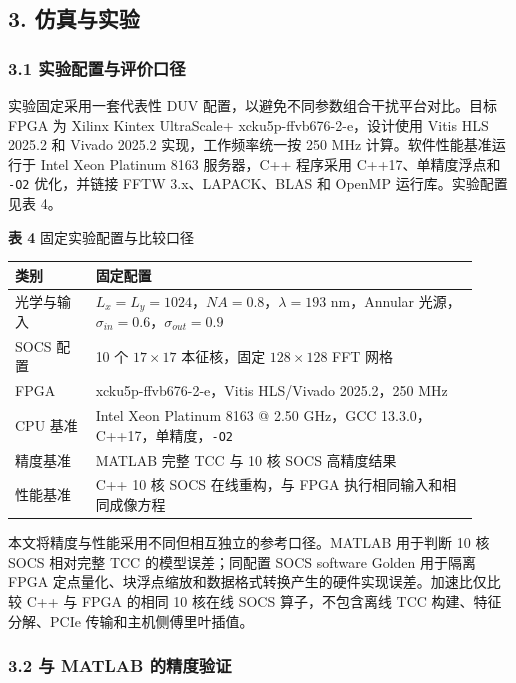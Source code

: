 \subsection{3. 仿真与实验}\label{sec:experiments}

\subsubsection{3.1 实验配置与评价口径}\label{sec:experimental-scope}

实验固定采用一套代表性 DUV 配置，以避免不同参数组合干扰平台对比。目标 FPGA 为 Xilinx Kintex UltraScale+ xcku5p-ffvb676-2-e，设计使用 Vitis HLS 2025.2 和 Vivado 2025.2 实现，工作频率统一按 250 MHz 计算。软件性能基准运行于 Intel Xeon Platinum 8163 服务器，C++ 程序采用 C++17、单精度浮点和 \texttt{-O2} 优化，并链接 FFTW 3.x、LAPACK、BLAS 和 OpenMP 运行库。实验配置见表 4。

\textbf{表 4} 固定实验配置与比较口径

\begin{table}[htbp]
\centering
\small
\begin{tabular}{p{0.16\linewidth}p{0.76\linewidth}}
\toprule
类别 & 固定配置 \\
\midrule
光学与输入 & $L_x=L_y=1024$，$NA=0.8$，$\lambda=193$ nm，Annular 光源，$\sigma_{in}=0.6$，$\sigma_{out}=0.9$ \\
SOCS 配置 & 10 个 $17\times17$ 本征核，固定 $128\times128$ FFT 网格 \\
FPGA & xcku5p-ffvb676-2-e，Vitis HLS/Vivado 2025.2，250 MHz \\
CPU 基准 & Intel Xeon Platinum 8163 @ 2.50 GHz，GCC 13.3.0，C++17，单精度，\texttt{-O2} \\
精度基准 & MATLAB 完整 TCC 与 10 核 SOCS 高精度结果 \\
性能基准 & C++ 10 核 SOCS 在线重构，与 FPGA 执行相同输入和相同成像方程 \\
\bottomrule
\end{tabular}
\end{table}

本文将精度与性能采用不同但相互独立的参考口径。MATLAB 用于判断 10 核 SOCS 相对完整 TCC 的模型误差；同配置 SOCS software Golden 用于隔离 FPGA 定点量化、块浮点缩放和数据格式转换产生的硬件实现误差。加速比仅比较 C++ 与 FPGA 的相同 10 核在线 SOCS 算子，不包含离线 TCC 构建、特征分解、PCIe 传输和主机侧傅里叶插值。

\subsubsection{3.2 与 MATLAB 的精度验证}\label{sec:matlab-accuracy}


